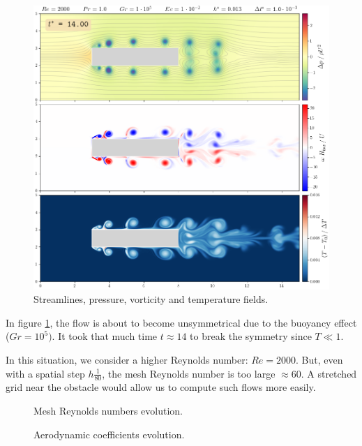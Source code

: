 \documentclass[11 pt]{article}
\begin{document}
\begin{figure}[H]
    \centering
    \includegraphics[width=\textwidth]{../figures/frame_00140_eckert.png}
    \caption{Streamlines, pressure, vorticity and temperature fields.}
    \label{fig:simu_eckert}
\end{figure}

In figure \ref{fig:simu_eckert}, the flow is about to become unsymmetrical due to the buoyancy effect ($Gr=10^5)$. It took that much time $t \approx 14$ to break the symmetry since $T \ll 1$.

In this situation, we consider a higher Reynolds number: $Re=2000$. But, even with a spatial step $h\frac{1}{80}$, the mesh Reynolds number is too large $\approx 60$. A stretched grid near the obstacle would allow us to compute such flows more easily.

\begin{figure}[H]
    \centering
    
    \caption{Mesh Reynolds numbers evolution.}
    \label{fig:mesh_re_eckert}
\end{figure}

\begin{figure}[H]
    \centering
    
    \caption{Aerodynamic coefficients evolution.}
    \label{fig:drag_eckert}
\end{figure}


\newpage


\nocite{*}

\end{document}
